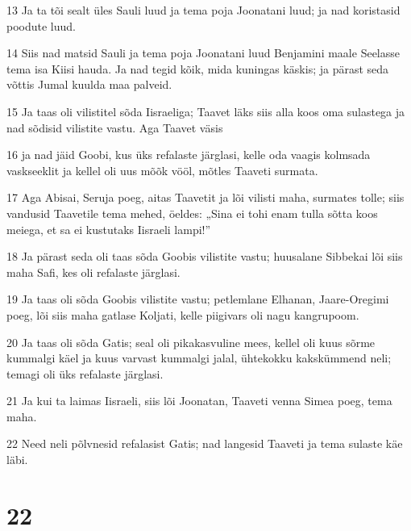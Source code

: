 \par 13 Ja ta tõi sealt üles Sauli luud ja tema poja Joonatani luud; ja nad koristasid poodute luud.
\par 14 Siis nad matsid Sauli ja tema poja Joonatani luud Benjamini maale Seelasse tema isa Kiisi hauda. Ja nad tegid kõik, mida kuningas käskis; ja pärast seda võttis Jumal kuulda maa palveid.
\par 15 Ja taas oli vilistitel sõda Iisraeliga; Taavet läks siis alla koos oma sulastega ja nad sõdisid vilistite vastu. Aga Taavet väsis
\par 16 ja nad jäid Goobi, kus üks refalaste järglasi, kelle oda vaagis kolmsada vaskseeklit ja kellel oli uus mõõk vööl, mõtles Taaveti surmata.
\par 17 Aga Abisai, Seruja poeg, aitas Taavetit ja lõi vilisti maha, surmates tolle; siis vandusid Taavetile tema mehed, öeldes: „Sina ei tohi enam tulla sõtta koos meiega, et sa ei kustutaks Iisraeli lampi!”
\par 18 Ja pärast seda oli taas sõda Goobis vilistite vastu; huusalane Sibbekai lõi siis maha Safi, kes oli refalaste järglasi.
\par 19 Ja taas oli sõda Goobis vilistite vastu; petlemlane Elhanan, Jaare-Oregimi poeg, lõi siis maha gatlase Koljati, kelle piigivars oli nagu kangrupoom.
\par 20 Ja taas oli sõda Gatis; seal oli pikakasvuline mees, kellel oli kuus sõrme kummalgi käel ja kuus varvast kummalgi jalal, ühtekokku kakskümmend neli; temagi oli üks refalaste järglasi.
\par 21 Ja kui ta laimas Iisraeli, siis lõi Joonatan, Taaveti venna Simea poeg, tema maha.
\par 22 Need neli põlvnesid refalasist Gatis; nad langesid Taaveti ja tema sulaste käe läbi.

\chapter{22}


